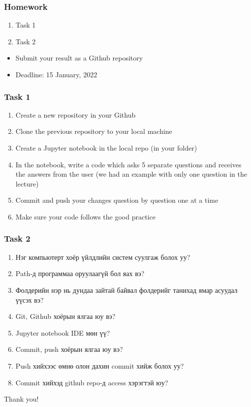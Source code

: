 \documentclass{beamer}
\begin{document}
\begin{frame}
    \frametitle{Homework}
    \begin{enumerate}
        \item Task 1
        \item Task 2
    \end{enumerate}
\vskip 2mm
    \begin{itemize}
        \item Submit your result as a Github repository
        \item Deadline: 15 January, 2022
    \end{itemize}

\end{frame}

\begin{frame}
    \frametitle{Task 1}
    \begin{enumerate}
        \item Create a new repository in your Github
        \item Clone the previous repository to your local machine
        \item Create a Jupyter notebook in the local repo (in your folder)
        \item In the notebook, write a code which asks 5 separate questions and 
        receives the answers from the user (we had an example with only one question
        in the lecture)
        \item Commit and push your changes question by question one at a time
        \item Make sure your code follows the good practice
    \end{enumerate}
\end{frame}

\begin{frame}
    \frametitle{Task 2}
    \begin{enumerate}
        \item Нэг компьютерт хоёр үйлдлийн систем суулгаж болох уу?
        \item Path-д программаа оруулаагүй бол яах вэ?
        \item Фолдерийн нэр нь дундаа зайтай байвал фолдерийг танихад ямар асуудал үүсэх вэ?
        \item Git, Github хоёрын ялгаа юу вэ?
        \item Jupyter notebook IDE мөн үү?
        \item Commit, push хоёрын ялгаа юу вэ?
        \item Push хийхээс өмнө олон дахин commit хийж болох уу?
        \item Commit хийхэд github repo-д access хэрэгтэй юу?
    \end{enumerate}
\end{frame}

\begin{frame}
\Huge{\centerline{Thank you!}}
\end{frame}

\end{document}
